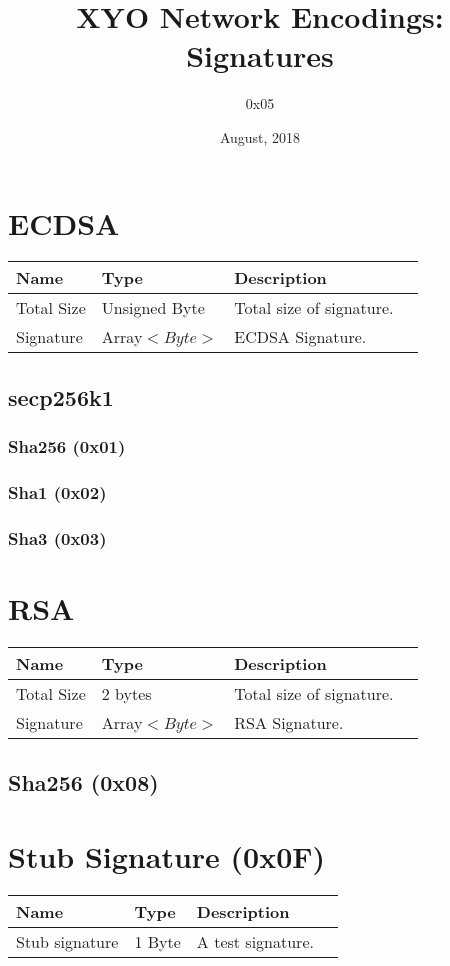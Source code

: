 \documentclass[11pt]{article}
\title{XYO Network Encodings: Signatures}
\author{0x05}
\date{August, 2018}
\begin{document}
\maketitle

\section{ECDSA}

\begin{center}
\begin{tabular}{ |l|l|l|l| } 
\hline
\textbf{Name} & \textbf{Type} & \textbf{Description}\\
\hline
Total Size & Unsigned Byte & Total size of signature. \\
Signature & Array$<Byte>$ & ECDSA Signature.\\ 
   
\hline
\end{tabular}
\end{center}

\subsection{secp256k1}
\subsubsection{Sha256 (0x01)} 
\subsubsection{Sha1 (0x02)} 
\subsubsection{Sha3 (0x03)} 

\section{RSA}
\begin{center}
\begin{tabular}{ |l|l|l|l| } 
\hline
\textbf{Name} & \textbf{Type} & \textbf{Description}\\
\hline
Total Size & 2 bytes & Total size of signature. \\
Signature & Array$<Byte>$ & RSA Signature.\\ 
   
\hline
\end{tabular}
\end{center}
\subsection{Sha256 (0x08)} 



\section{Stub Signature (0x0F)}
\begin{center}
\begin{tabular}{ |l|l|l|l| } 
\hline
\textbf{Name} & \textbf{Type} & \textbf{Description}\\
\hline
Stub signature & 1 Byte & A test signature. \\
   
\hline
\end{tabular}
\end{center}
\end{document}
